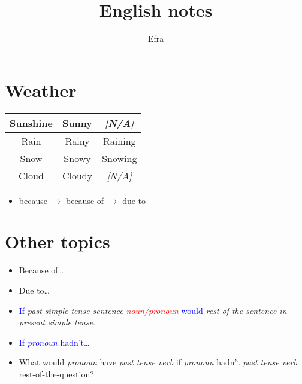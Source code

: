 \documentclass[11pt]{article} %
\title{English notes}
\author{Efra}
\begin{document}
\maketitle
\tableofcontents







\section{Weather}
\begin{multicols}{2}
\begin{tabular}{|c|c|c|}
\hline
Sunshine & Sunny & \emph{[N/A]} \\
\hline
Rain & Rainy & Raining\\
\hline
Snow & Snowy & Snowing\\
\hline
Cloud & Cloudy & \emph{[N/A]}\\
\hline
\end{tabular}

\begin{itemize}
\item because $\rightarrow$ because of $\rightarrow$ due to
\end{itemize}
\end{multicols}



\section{Other topics}
\begin{multicols}{2}
\begin{itemize}
\item Because of\dots
\item Due to\dots
\item \textcolor{blue}{If} \emph{past simple tense sentence} \textcolor{red}{\emph{noun/pronoun}} \textcolor{blue}{would} \emph{rest of the sentence in present simple tense}.
\item \textcolor{blue}{If \emph{pronoun} hadn't\dots}
\item What would \emph{pronoun} have \emph{past tense verb} if \emph{pronoun} hadn't \emph{past tense verb} rest-of-the-question?
\end{itemize}
\end{multicols}


\end{document}
